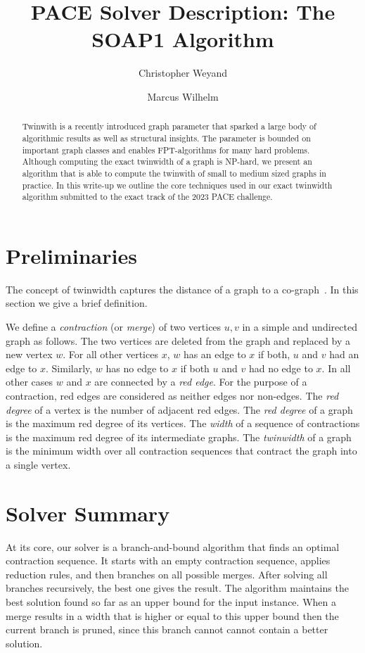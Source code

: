 \documentclass[a4paper,UKenglish,cleveref, autoref, thm-restate]{lipics-v2021}
\title{PACE Solver Description: The SOAP1 Algorithm} %
\author{Christopher Weyand}{Karlsruhe Institute of Technology, Karlsruhe, Germany}{christopher.weyand@kit.edu}{https://orcid.org/0000-0003-0354-6650}{}
\author{Marcus Wilhelm}{Karlsruhe Institute of Technology, Karlsruhe, Germany}{marcus.wilhelm@kit.edu}{https://orcid.org/0000-0002-4507-0622}{}
\begin{document}
\maketitle

\begin{abstract}
Twinwith is a recently introduced graph parameter that sparked a large body of algorithmic results as well as structural insights.
The parameter is bounded on important graph classes and enables FPT-algorithms for many hard problems.
Although computing the exact twinwidth of a graph is NP-hard, we present an algorithm that is able to compute the twinwith of small to medium sized graphs in practice.
In this write-up we outline the core techniques used in our exact twinwidth algorithm submitted to the exact track of the 2023 PACE challenge.
\end{abstract}

\section{Preliminaries}
The concept of twinwidth captures the distance of a graph to a co-graph~\cite{twin1}.
In this section we give a brief definition.

We define a \emph{contraction} (or \emph{merge}) of two vertices $u,v$ in a simple and undirected graph as follows.
The two vertices are deleted from the graph and replaced by a new vertex $w$.
For all other vertices $x$, $w$ has an edge to $x$ if both, $u$ and $v$ had an edge to $x$.
Similarly, $w$ has no edge to $x$ if both $u$ and $v$ had no edge to $x$.
In all other cases $w$ and $x$ are connected by a \emph{red edge}.
For the purpose of a contraction, red edges are considered as neither edges nor non-edges.
The \emph{red degree} of a vertex is the number of adjacent red edges.
The \emph{red degree} of a graph is the maximum red degree of its vertices.
The \emph{width} of a sequence of contractions is the maximum red degree of its intermediate graphs.
The \emph{twinwidth} of a graph is the minimum width over all contraction sequences that contract the graph into a single vertex.

\section{Solver Summary}
At its core, our solver is a branch-and-bound algorithm that finds an optimal contraction sequence.
It starts with an empty contraction sequence, applies reduction rules, and then branches on all possible merges.
After solving all branches recursively, the best one gives the result.
The algorithm maintains the best solution found so far as an upper bound for the input instance.
When a merge results in a width that is higher or equal to this upper bound then the current branch is pruned, since this branch cannot cannot contain a better solution.
\end{document}
